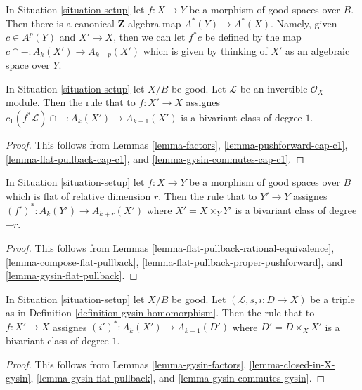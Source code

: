 \begin{remark}
\label{remark-pullback-cohomology}
In Situation \ref{situation-setup} let $f : X \to Y$ be a morphism of
good spaces over $B$.
Then there is a canonical $\mathbf{Z}$-algebra map $A^*(Y) \to A^*(X)$.
Namely, given $c \in A^p(Y)$ and $X' \to X$, then we can let $f^*c$
be defined by the map $c \cap - : A_k(X') \to A_{k - p}(X')$ which is
given by thinking of $X'$ as an algebraic space over $Y$.
\end{remark}

\begin{lemma}
\label{lemma-cap-c1-bivariant}
In Situation \ref{situation-setup} let $X/B$ be good.
Let $\mathcal{L}$ be an invertible $\mathcal{O}_X$-module.
Then the rule that to $f : X' \to X$ assignes
$c_1(f^*\mathcal{L}) \cap - : A_k(X') \to A_{k - 1}(X')$
is a bivariant class of degree $1$.
\end{lemma}

\begin{proof}
This follows from Lemmas \ref{lemma-factors},
\ref{lemma-pushforward-cap-c1},
\ref{lemma-flat-pullback-cap-c1}, and
\ref{lemma-gysin-commutes-cap-c1}.
\end{proof}

\begin{lemma}
\label{lemma-flat-pullback-bivariant}
In Situation \ref{situation-setup} let $f : X \to Y$ be a morphism
of good spaces over $B$ which is flat of relative dimension $r$.
Then the rule that to $Y' \to Y$ assignes
$(f')^* : A_k(Y') \to A_{k + r}(X')$ where $X' = X \times_Y Y'$
is a bivariant class of degree $-r$.
\end{lemma}

\begin{proof}
This follows from
Lemmas \ref{lemma-flat-pullback-rational-equivalence},
\ref{lemma-compose-flat-pullback},
\ref{lemma-flat-pullback-proper-pushforward}, and
\ref{lemma-gysin-flat-pullback}.
\end{proof}

\begin{lemma}
\label{lemma-gysin-bivariant}
In Situation \ref{situation-setup} let $X/B$ be good.
Let $(\mathcal{L}, s, i : D \to X)$ be a triple as in
Definition \ref{definition-gysin-homomorphism}.
Then the rule that to $f : X' \to X$ assignes
$(i')^* : A_k(X') \to A_{k - 1}(D')$ where $D' = D \times_X X'$
is a bivariant class of degree $1$.
\end{lemma}

\begin{proof}
This follows from Lemmas \ref{lemma-gysin-factors},
\ref{lemma-closed-in-X-gysin},
\ref{lemma-gysin-flat-pullback}, and
\ref{lemma-gysin-commutes-gysin}.
\end{proof}

